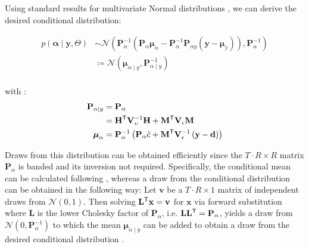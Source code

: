 \documentclass[notitlepage,a4paper,12pt]{article}
\newcommand{\transpose}[1]{{#1}^{\sf{T}}}
\begin{document}
Using standard results for multivariate Normal distributions \citep[e.g.][pp. 86-87]{bishop_prml_2006}, we can derive the desired conditional distribution:

\begin{align*}
    p
    \left(
        \boldsymbol{\alpha} \mid \mathbf{y}, \Theta
     \right) 
    &\sim
    \mathcal{N}
    \left(
    \mathbf{P}^{-1}_{\alpha} \left( \mathbf{P}_{\alpha}\boldsymbol{\mu}_{\alpha} - \mathbf{P}^{-1}_{\alpha} \mathbf{P}_{\alpha y} \left(\mathbf{y} - \boldsymbol{\mu}_{\text{y}}\right)\right), \mathbf{P}_{\alpha}^{-1}
    \right) \\
    &\coloneqq \mathcal{N}
        \left(
            \boldsymbol{\mu}_{\alpha\mid y}, \mathbf{P}_{\alpha\mid y}^{-1}
        \right) \\
\end{align*}

with \citep[see also][eqn. XXXX]{chanjeliazkov_2009}:
\begin{align*}
    \mathbf{P}_{\alpha\mid y} &= \mathbf{P}_{\alpha} \\
    &= 
    \transpose{\mathbf{H}} \mathbf{V}^{-1}_{\upsilon} \mathbf{H} + {\transpose{\mathbf{M}} \mathbf{V}_{\epsilon}\mathbf{M}}\\
    \boldsymbol\mu_{\alpha} &= \mathbf{P}_{\alpha}^{-1} \left(\mathbf{P}_{\alpha} \tilde{c}+ \transpose{\mathbf{M}} \mathbf{V}_{\epsilon}^{-1} \left(\mathbf{y} - \mathbf{d}\right) \right)
\end{align*}





Draws from this distribution can be obtained efficiently since the $T\cdot R \times R$ matrix $\mathbf{P}_{\alpha}$ is banded and its inversion not required. Specifically, the conditional mean can be calculated following \citet[][Algorithm 5]{rueheld_2005}, whereas a draw from the conditional distribution can be obtained in the following way: Let $\mathbf{v}$ be a $T\cdot R \times 1$ matrix of independent draws from $\mathcal{N}(0,1)$. Then solving $\transpose{\mathbf{L}}\mathbf{x} = \mathbf{v}$ for $\mathbf{x}$ via forward substitution where $\mathbf{L}$ is the lower Cholesky factor of $\mathbf{P}_{\alpha}$, i.e. $\mathbf{L}\transpose{\mathbf{L}} = \mathbf{P}_{\alpha}$, yields a draw from $\mathcal{N}(0, \mathbf{P}^{-1}_{\alpha})$ to which the mean $\mathbf{\mu}_{\alpha\mid y}$ can be added to obtain a draw from the desired conditional distribution \citep[][Algorithm 4]{rueheld_2005}.
\end{document}
